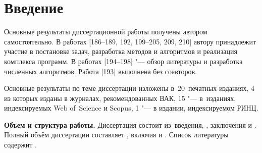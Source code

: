 \chapter*{Введение}                         %

\newcommand{\actuality}{}
\newcommand{\progress}{}
\newcommand{\aim}{{\textbf\aimTXT}}
\newcommand{\tasks}{\textbf{\tasksTXT}}
\newcommand{\object}{\textbf{\objectTXT}}
\newcommand{\objective}{\textbf{\objectiveTXT}}
\newcommand{\novelty}{\textbf{\noveltyTXT}}
\newcommand{\speciality}{\textbf{\specialityTXT}}
\newcommand{\influence}{\textbf{\influenceTXT}}
\newcommand{\methods}{\textbf{\methodsTXT}}
\newcommand{\defpositions}{\textbf{\defpositionsTXT}}
\newcommand{\reliability}{\textbf{\reliabilityTXT}}
\newcommand{\probation}{\textbf{\probationTXT}}
\newcommand{\contribution}{\textbf{\contributionTXT}}
\newcommand{\publications}{\textbf{\publicationsTXT}}


{\contribution} Основные результаты диссертационной работы получены автором самостоятельно. В работах [186--189, 192, 199--205, 209, 210] автору принадлежит участие в постановке задач, разработка методов и алгоритмов и реализация комплекса программ. В работах [194--198] "--- обзор литературы и разработка численных алгоритмов. Работа [193] выполнена без соавторов.

{\publications} Основные результаты по теме диссертации изложены в~20~печатных изданиях,
    4 из которых изданы в журналах, рекомендованных ВАК, 15 "--- в~изданиях, индексируемых Web of~Science и Scopus, 1 "--- в издании, индексируемом РИНЦ.


\textbf{Объем и структура работы.} Диссертация состоит из~введения,
,
заключения и
.
%
Полный объём диссертации составляет
, включая
 и
.
Список литературы содержит
.
